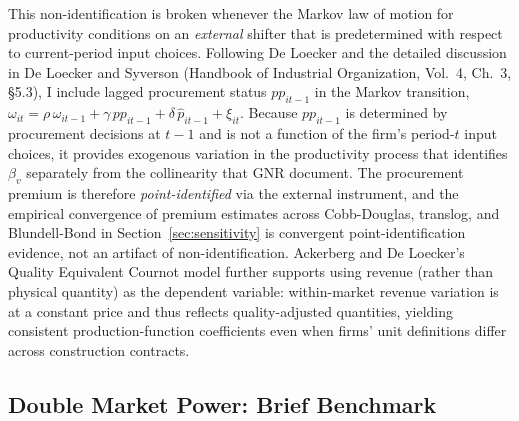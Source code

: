 \documentclass[11pt]{article}
\begin{document}
This non-identification is broken whenever the Markov law of motion for productivity conditions on an \emph{external} shifter that is predetermined with respect to current-period input choices. Following De Loecker \cite{DeLoecker2013} and the detailed discussion in De Loecker and Syverson \cite{DLS2021} (Handbook of Industrial Organization, Vol.~4, Ch.~3, \S5.3), I include lagged procurement status $pp_{it-1}$ in the Markov transition, $\omega_{it} = \rho\,\omega_{it-1} + \gamma\,pp_{it-1} + \delta\,\hat p_{it-1} + \xi_{it}$. Because $pp_{it-1}$ is determined by procurement decisions at $t-1$ and is not a function of the firm's period-$t$ input choices, it provides exogenous variation in the productivity process that identifies $\beta_v$ separately from the collinearity that GNR document. The procurement premium is therefore \emph{point-identified} via the external instrument, and the empirical convergence of premium estimates across Cobb-Douglas, translog, and Blundell-Bond in Section~\ref{sec:sensitivity} is convergent point-identification evidence, not an artifact of non-identification. Ackerberg and De Loecker's \cite{ADLQEC2026} Quality Equivalent Cournot model further supports using revenue (rather than physical quantity) as the dependent variable: within-market revenue variation is at a constant price and thus reflects quality-adjusted quantities, yielding consistent production-function coefficients even when firms' unit definitions differ across construction contracts.

\subsection{Double Market Power: Brief Benchmark}\label{app:klms}
\end{document}
